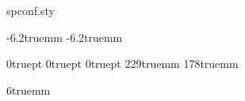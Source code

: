\begin{filecontents*}[overwrite]{spconf.sty}
\renewcommand{\sfdefault}{phv}
\renewcommand{\rmdefault}{ptm}
\renewcommand{\ttdefault}{pcr}

\oddsidemargin  -6.2truemm
\evensidemargin -6.2truemm

\topmargin 0truept
\headheight 0truept
\headsep 0truept
\textheight 229truemm
\textwidth 178truemm

\twocolumn
\columnsep 6truemm
\pagestyle{empty}

\emergencystretch=11pt

\def\ninept{\def\baselinestretch{.95}\let\normalsize\small\normalsize}

\def\maketitle{\par
 \begingroup
 \def\thefootnote{}
 \def\@makefnmark{\hbox
 {$^{\@thefnmark}$\hss}}
 \if@twocolumn
 \twocolumn[\@maketitle]
 \else \newpage
 \global\@topnum\z@ \@maketitle \fi\@thanks
 \endgroup
 \setcounter{footnote}{0}
 \let\maketitle\relax
 \let\@maketitle\relax
 \gdef\thefootnote{\arabic{footnote}}\gdef\@@savethanks{}%
 \gdef\@thanks{}\gdef\@author{}\gdef\@title{}\let\thanks\relax}

\def\@maketitle{\newpage
 \null
 \vskip 2em \begin{center}
 {\large \bf \@title \par} \vskip 1.5em {\large \lineskip .5em
\begin{tabular}[t]{c}\@name \\ \@address
 \end{tabular}\par} \end{center}
 \par
 \vskip 1.5em}


\end{filecontents*}
